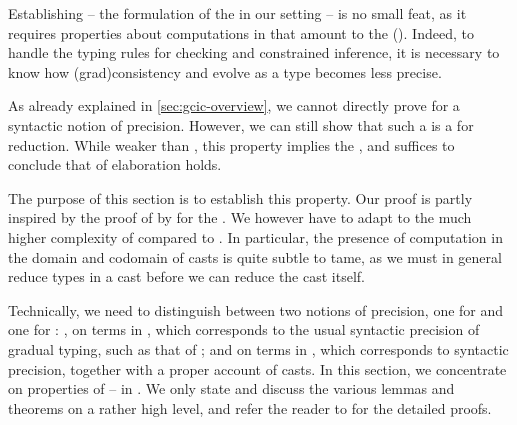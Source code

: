 Establishing  – the formulation of
the   in our setting – is no small feat, as it
requires properties about
computations in  that amount to the  ().
Indeed, to handle
the typing rules for checking and constrained inference, it is
necessary to know how \kl(grad){consistency} and  evolve as a type
becomes less precise.

As already explained in \cref{sec:gcic-overview}, we
cannot directly prove  for a syntactic notion of
precision. However, we can still show that such a 
is a  for reduction.
While weaker than , this property implies the ,
and suffices to conclude that  of elaboration holds.

The purpose of this section is to establish this property.
Our proof is partly inspired by the proof of  by
 for the .%
We however have to adapt to the much higher complexity of  compared to .
In particular, the presence of computation in the domain and codomain of casts is quite subtle
to tame, as we must in general reduce types in a cast before we can reduce the cast itself.%

Technically, we need to distinguish between two notions of precision,
one for  and one for :
, on terms in , which corresponds to the
usual syntactic precision of gradual typing, such as that of \textcite{Siek2015};
and  on terms in , which corresponds
to syntactic precision, together with a proper account of casts.
In this section, we concentrate on properties of  – in . 
We only state and discuss the various lemmas and
theorems on a rather high level, and refer the reader to
 for the detailed proofs.

